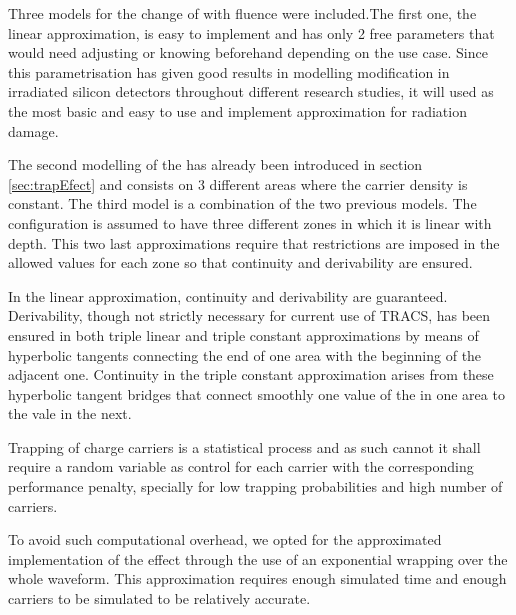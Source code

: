 
Three models for the change of \neff with fluence were included.The first one, the linear approximation, is easy to implement and has only 2 free parameters that would need adjusting or knowing beforehand depending on the use case. Since this parametrisation has given good results in modelling \neff modification in irradiated silicon detectors throughout different research studies, it will used as the most basic and easy to use and implement approximation for radiation damage.

The second modelling of the \neff  has already been introduced in section \ref{sec:trapEfect} and consists on 3 different areas where the carrier density is constant. 
The third model is a combination of the two previous models. The \neff configuration is assumed to have three different zones in which it is linear with depth. This two last approximations require that restrictions are imposed in the allowed values for each zone so that continuity and derivability are ensured.


In the linear approximation, continuity and derivability are guaranteed. Derivability, though not strictly necessary for current use of TRACS, has been ensured in both triple linear and triple constant approximations by means of hyperbolic tangents connecting the end of one area with the beginning of the adjacent one. Continuity in the triple constant approximation arises from these hyperbolic tangent bridges that connect smoothly one value of the \neff in one area to the vale in the next. 


Trapping of charge carriers is a statistical process and as such cannot it shall require a random variable as control for each carrier with the corresponding performance penalty, specially for low trapping probabilities and high number of carriers.

To avoid such computational overhead, we opted for the approximated implementation of the effect through the use of an exponential wrapping over the whole waveform. This approximation requires enough simulated time and enough carriers to be simulated to be relatively accurate. 

